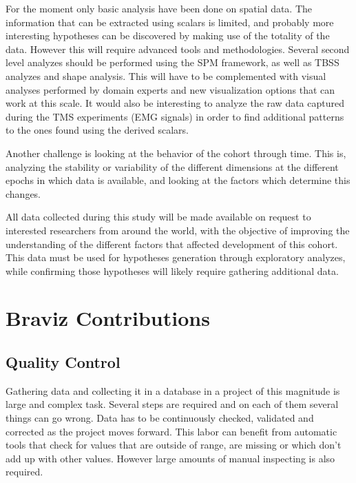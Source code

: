 For the moment only basic analysis have been done on spatial data. The information that can be extracted using scalars is limited, and probably more interesting hypotheses can be discovered by making use of the totality of the data. However this will require advanced tools and methodologies. Several second level analyzes should be performed using the SPM framework, as well as TBSS analyzes and shape analysis. This will have to be complemented with visual analyses performed by domain experts and new visualization options that can work at this scale. It would also be interesting to analyze the raw data captured during the TMS experiments (EMG signals) in order to find additional patterns to the ones found using the derived scalars. 

Another challenge is looking at the behavior of the cohort through time. This is, analyzing the stability or variability of the different dimensions at the different epochs in which data is available, and looking at the factors which determine this changes.

All data collected during this study will be made available on request to interested researchers from around the world, with the objective of improving the understanding of the different factors that affected development of this cohort. This data must be used for hypotheses generation through exploratory analyzes, while confirming those hypotheses will likely require gathering additional data.



\section{Braviz Contributions}

\subsection{Quality Control}

Gathering data and collecting it in a database in a project of this magnitude is large and complex task. Several steps are required and on each of them several things can go wrong. Data has to be continuously checked, validated and corrected as the project moves forward. This labor can benefit from automatic tools that check for values that are outside of range, are missing or which don't add up with other values. However large amounts of manual inspecting is also required. 

